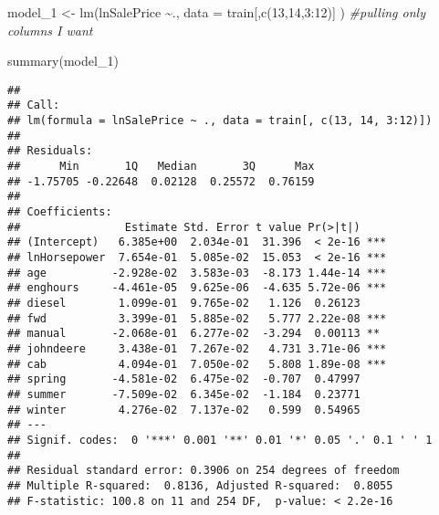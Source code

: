 \documentclass[
]{article}
\newenvironment{Shaded}{\begin{snugshade}}{\end{snugshade}}
\newcommand{\AttributeTok}[1]{\textcolor[rgb]{0.77,0.63,0.00}{#1}}
\newcommand{\CommentTok}[1]{\textcolor[rgb]{0.56,0.35,0.01}{\textit{#1}}}
\newcommand{\DecValTok}[1]{\textcolor[rgb]{0.00,0.00,0.81}{#1}}
\newcommand{\FunctionTok}[1]{\textcolor[rgb]{0.00,0.00,0.00}{#1}}
\newcommand{\NormalTok}[1]{#1}
\newcommand{\OtherTok}[1]{\textcolor[rgb]{0.56,0.35,0.01}{#1}}
\newcommand{\SpecialCharTok}[1]{\textcolor[rgb]{0.00,0.00,0.00}{#1}}
\newcommand{\StringTok}[1]{\textcolor[rgb]{0.31,0.60,0.02}{#1}}
\begin{document}
\begin{Shaded}
\begin{Highlighting}[]
\NormalTok{model\_1 }\OtherTok{\textless{}{-}} \FunctionTok{lm}\NormalTok{(lnSalePrice }\SpecialCharTok{\textasciitilde{}}\NormalTok{., }\AttributeTok{data =}\NormalTok{ train[,}\FunctionTok{c}\NormalTok{(}\DecValTok{13}\NormalTok{,}\DecValTok{14}\NormalTok{,}\DecValTok{3}\SpecialCharTok{:}\DecValTok{12}\NormalTok{)] ) }\CommentTok{\#pulling only columns I want}

\FunctionTok{summary}\NormalTok{(model\_1)}
\end{Highlighting}
\end{Shaded}

\begin{verbatim}
## 
## Call:
## lm(formula = lnSalePrice ~ ., data = train[, c(13, 14, 3:12)])
## 
## Residuals:
##      Min       1Q   Median       3Q      Max 
## -1.75705 -0.22648  0.02128  0.25572  0.76159 
## 
## Coefficients:
##                Estimate Std. Error t value Pr(>|t|)    
## (Intercept)   6.385e+00  2.034e-01  31.396  < 2e-16 ***
## lnHorsepower  7.654e-01  5.085e-02  15.053  < 2e-16 ***
## age          -2.928e-02  3.583e-03  -8.173 1.44e-14 ***
## enghours     -4.461e-05  9.625e-06  -4.635 5.72e-06 ***
## diesel        1.099e-01  9.765e-02   1.126  0.26123    
## fwd           3.399e-01  5.885e-02   5.777 2.22e-08 ***
## manual       -2.068e-01  6.277e-02  -3.294  0.00113 ** 
## johndeere     3.438e-01  7.267e-02   4.731 3.71e-06 ***
## cab           4.094e-01  7.050e-02   5.808 1.89e-08 ***
## spring       -4.581e-02  6.475e-02  -0.707  0.47997    
## summer       -7.509e-02  6.345e-02  -1.184  0.23771    
## winter        4.276e-02  7.137e-02   0.599  0.54965    
## ---
## Signif. codes:  0 '***' 0.001 '**' 0.01 '*' 0.05 '.' 0.1 ' ' 1
## 
## Residual standard error: 0.3906 on 254 degrees of freedom
## Multiple R-squared:  0.8136, Adjusted R-squared:  0.8055 
## F-statistic: 100.8 on 11 and 254 DF,  p-value: < 2.2e-16
\end{verbatim}

\begin{Shaded}
\end{Shaded}
\end{document}
